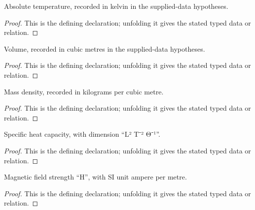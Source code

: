 \begin{definition}[Temperature]
  \label{decl:physics:IPhO_2026_3_C_3:Temperature}
  Absolute temperature, recorded in kelvin in the supplied-data hypotheses.
\end{definition}
\begin{proof}
  This is the defining declaration; unfolding it gives the stated typed data or relation.
\end{proof}

\begin{definition}[Volume]
  \label{decl:physics:IPhO_2026_3_C_3:Volume}
  Volume, recorded in cubic metres in the supplied-data hypotheses.
\end{definition}
\begin{proof}
  This is the defining declaration; unfolding it gives the stated typed data or relation.
\end{proof}

\begin{definition}[MassDensity]
  \label{decl:physics:IPhO_2026_3_C_3:MassDensity}
  Mass density, recorded in kilograms per cubic metre.
\end{definition}
\begin{proof}
  This is the defining declaration; unfolding it gives the stated typed data or relation.
\end{proof}

\begin{definition}[SpecificHeatCapacity]
  \label{decl:physics:IPhO_2026_3_C_3:SpecificHeatCapacity}
  Specific heat capacity, with dimension “L² T⁻² Θ⁻¹”.
\end{definition}
\begin{proof}
  This is the defining declaration; unfolding it gives the stated typed data or relation.
\end{proof}

\begin{definition}[MagneticFieldStrength]
  \label{decl:physics:IPhO_2026_3_C_3:MagneticFieldStrength}
  Magnetic field strength “H”, with SI unit ampere per metre.
\end{definition}
\begin{proof}
  This is the defining declaration; unfolding it gives the stated typed data or relation.
\end{proof}

